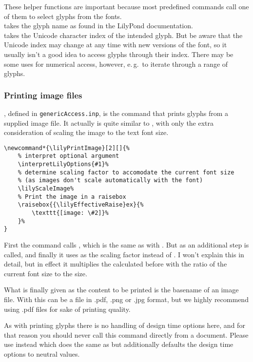 \documentclass{article}
\begin{document}
\medskip
These helper functions are important because most predefined commands call one of them to select glyphs from the \emmentaler fonts.\\
 takes the glyph name as found in the LilyPond documentation.\\
 takes the Unicode character index of the intended glyph.
But be aware that the Unicode index may change at any time with new versions of the \emmentaler font, so it usually isn't a good idea to access glyphs through their index.
There may be some uses for numerical access, however, e.\,g.\ to iterate through a range of glyphs.

\subsubsection{Printing image files}
\label{subsubsec:printing_image_files}
, defined in \texttt{genericAccess.inp}, is the command that prints glyphs from a supplied image file.
It actually is quite similar to , with only the extra consideration of scaling the image to the text font size.

\begin{verbatim}
\newcommand*{\lilyPrintImage}[2][]{%
    % interpret optional argument
    \interpretLilyOptions{#1}%
    % determine scaling factor to accomodate the current font size 
    % (as images don't scale automatically with the font)
    \lilyScaleImage%
    % Print the image in a raisebox
    \raisebox{{\lilyEffectiveRaise}ex}{%
        \texttt{[image: \#2]}%
    }%
}
\end{verbatim}
First the command calls , which is the same as with .
But as an additional step  is called, and finally it uses  as the scaling factor instead of .
I won't explain this in detail, but in effect it multiplies the  calculated before with the ratio of the current font size to the  size.

What is finally given as the content to be printed is the basename of an image file.
With \XeLaTeX this can be a file in .pdf, .png or .jpg format, but we highly recommend using .pdf files for sake of printing quality.

As with printing \emmentaler glyphs there is no handling of design time options here, and for that reason you should never call this command directly from a document.
Please use  instead which does the same as  but additionally defaults the design time options to neutral values.
\end{document}
